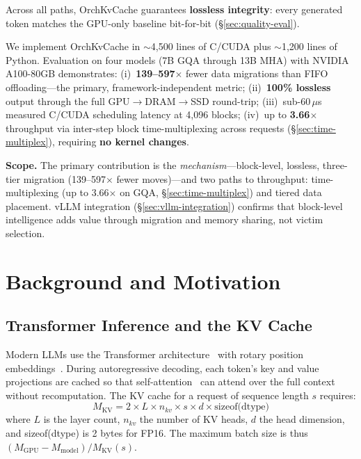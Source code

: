 \documentclass[conference]{IEEEtran}
\begin{document}
Across all paths, OrchKvCache guarantees \textbf{lossless integrity}: every generated token matches the GPU-only baseline bit-for-bit (\S\ref{sec:quality-eval}).

We implement OrchKvCache in ${\sim}$4,500 lines of C/CUDA plus ${\sim}$1,200 lines of Python. Evaluation on four models (7B GQA through 13B MHA) with NVIDIA A100-80GB demonstrates: (i)~\textbf{139--597$\times$} fewer data migrations than FIFO offloading---the primary, framework-independent metric; (ii)~\textbf{100\% lossless} output through the full GPU$\to$DRAM$\to$SSD round-trip; (iii)~sub-60\,$\mu$s measured C/CUDA scheduling latency at 4,096 blocks; (iv)~up to \textbf{3.66$\times$} throughput via inter-step block time-multiplexing across requests (\S\ref{sec:time-multiplex}), requiring \textbf{no kernel changes}.

\textbf{Scope.} The primary contribution is the \emph{mechanism}---block-level, lossless, three-tier migration (139--597$\times$ fewer moves)---and two paths to throughput: time-multiplexing (up to 3.66$\times$ on GQA, \S\ref{sec:time-multiplex}) and tiered data placement. vLLM integration (\S\ref{sec:vllm-integration}) confirms that block-level intelligence adds value through migration and memory sharing, not victim selection.

\section{Background and Motivation}
\subsection{Transformer Inference and the KV Cache}

Modern LLMs use the Transformer architecture~\cite{transformer} with rotary position embeddings~\cite{rope}. During autoregressive decoding, each token's key and value projections are cached so that self-attention~\cite{transformer} can attend over the full context without recomputation. The KV cache for a request of sequence length $s$ requires:
\begin{equation}
M_{\text{KV}} = 2 \times L \times n_{kv} \times s \times d \times \text{sizeof(dtype)}
\label{eq:kv-mem}
\end{equation}
where $L$ is the layer count, $n_{kv}$ the number of KV heads, $d$ the head dimension, and sizeof(dtype) is 2 bytes for FP16. The maximum batch size is thus $(M_{\text{GPU}} - M_{\text{model}}) / M_{\text{KV}}(s)$.
\end{document}
